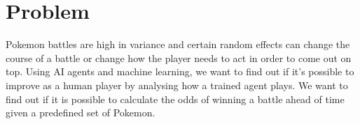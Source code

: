 \section{Problem}
\label{sec:problem-description}

Pokemon battles are high in variance and certain random effects can change 
the course of a battle or change how the player needs to act in order to 
come out on top. Using AI agents and machine learning, we want to find out 
if it's possible to improve as a human player by analysing how a trained 
agent plays. We want to find out if it is possible to calculate the odds 
of winning a battle ahead of time given a predefined set of Pokemon.
